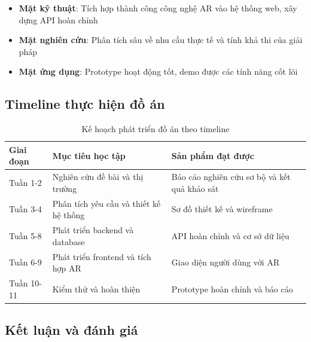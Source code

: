 \documentclass[12pt,a4paper]{article}
\begin{document}
\begin{tcolorbox}[colback=green!5!white,colframe=darkgreen,title=\textbf{Kết quả nghiên cứu chính}]
\begin{itemize}[leftmargin=1cm]
    \item \textbf{Mặt kỹ thuật}: Tích hợp thành công công nghệ AR vào hệ thống web, xây dựng API hoàn chỉnh
    \item \textbf{Mặt nghiên cứu}: Phân tích sâu về nhu cầu thực tế và tính khả thi của giải pháp
    \item \textbf{Mặt ứng dụng}: Prototype hoạt động tốt, demo được các tính năng cốt lõi
\end{itemize}
\end{tcolorbox}

\subsection{Timeline thực hiện đồ án}

\begin{table}[H]
\centering
\caption{Kế hoạch phát triển đồ án theo timeline}
\label{tab:project-timeline}
\begin{tabular}{@{}>{\raggedright\arraybackslash}p{2cm}>{\raggedright\arraybackslash}p{5cm}>{\raggedright\arraybackslash}p{5cm}@{}}
\toprule
\textbf{Giai đoạn} & \textbf{Mục tiêu học tập} & \textbf{Sản phẩm đạt được} \\
\midrule
Tuần 1-2 & Nghiên cứu đề bài và thị trường & Báo cáo nghiên cứu sơ bộ và kết quả khảo sát \\
Tuần 3-4 & Phân tích yêu cầu và thiết kế hệ thống & Sơ đồ thiết kế và wireframe \\
Tuần 5-8 & Phát triển backend và database & API hoàn chỉnh và cơ sở dữ liệu \\
Tuần 6-9 & Phát triển frontend và tích hợp AR & Giao diện người dùng với AR \\
Tuần 10-11 & Kiểm thử và hoàn thiện & Prototype hoàn chỉnh và báo cáo \\
\bottomrule
\end{tabular}
\end{table}

\subsection{Kết luận và đánh giá}
\end{document}
